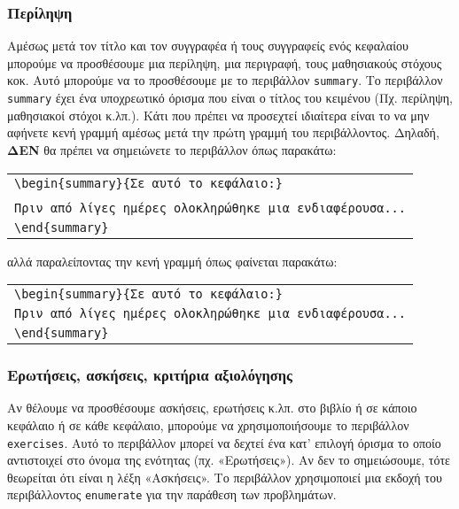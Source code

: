 \begin{refsection}
\subsubsection{Περίληψη}
Αμέσως μετά τον τίτλο και τον συγγραφέα ή τους συγγραφείς ενός κεφαλαίου μπορούμε να προσθέσουμε
μια περίληψη, μια περιγραφή, τους μαθησιακούς στόχους κοκ.
Αυτό μπορούμε να το προσθέσουμε με το περιβάλλον \texttt{summary}. Το περιβάλλον \texttt{summary} έχει ένα
υποχρεωτικό όρισμα που είναι ο τίτλος του κειμένου (Πχ. περίληψη, μαθησιακοί στόχοι κ.λπ.).
Κάτι που πρέπει να προσεχτεί ιδιαίτερα είναι το να μην αφήνετε κενή γραμμή αμέσως μετά την πρώτη
γραμμή του περιβάλλοντος. Δηλαδή, \textbf{ΔΕΝ} θα πρέπει να σημειώνετε το περιβάλλον όπως
παρακάτω:
\begin{center}
\begin{tabular}{l}
\verb=\begin{summary}{Σε αυτό το κεφάλαιο:}=\\
\\
\verb=Πριν από λίγες ημέρες ολοκληρώθηκε μια ενδιαφέρουσα...=\\
\verb=\end{summary}=\\
\end{tabular}
\end{center}
αλλά παραλείποντας την κενή γραμμή όπως φαίνεται παρακάτω:
\begin{center}
\begin{tabular}{l}
\verb=\begin{summary}{Σε αυτό το κεφάλαιο:}=\\
\verb=Πριν από λίγες ημέρες ολοκληρώθηκε μια ενδιαφέρουσα...=\\
\verb=\end{summary}=\\
\end{tabular}
\end{center}
\subsubsection{Ερωτήσεις, ασκήσεις, κριτήρια αξιολόγησης}
Αν θέλουμε να προσθέσουμε ασκήσεις, ερωτήσεις κ.λπ. στο βιβλίο ή σε κάποιο κεφάλαιο ή σε κάθε
κεφάλαιο, μπορούμε να χρησιμοποιήσουμε το περιβάλλον \texttt{exercises}. Αυτό το περιβάλλον μπορεί
να δεχτεί ένα κατ’ επιλογή όρισμα το οποίο αντιστοιχεί στο όνομα της ενότητας (πχ. «Ερωτήσεις»).
Αν δεν το σημειώσουμε, τότε θεωρείται ότι είναι η λέξη «Ασκήσεις». Το περιβάλλον χρησιμοποιεί μια
εκδοχή του περιβάλλοντος \texttt{enumerate} για την παράθεση των προβλημάτων.


\end{refsection}
